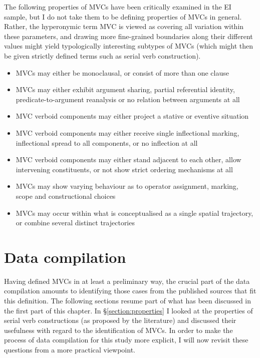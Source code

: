 The following properties of MVCs have been critically examined in the EI sample, but I do not take them to be defining properties of MVCs in general. Rather, the hyperonymic term MVC is viewed as covering all variation within these parameters, and drawing more fine-grained boundaries along their different values might yield typologically interesting subtypes of MVCs (which might then be given strictly defined terms such as serial verb construction).

\begin{itemize}
\item MVCs may either be monoclausal, or consist of more than one clause
\item MVCs may either exhibit argument sharing, partial referential identity, predicate-to-argument reanalysis or no relation between arguments at all
\item MVC verboid components may either project a stative or eventive situation
\item MVC verboid components may either receive single inflectional marking, inflectional spread to all components, or no inflection at all
\item MVC verboid components may either stand adjacent to each other, allow intervening constituents, or not show strict ordering mechanisms at all
\item MVCs may show varying behaviour as to operator assignment, marking, scope and constructional choices
\item MVCs may occur within what is conceptualised as a single spatial trajectory, or combine several distinct trajectories 
\end{itemize}

\section{Data compilation}

Having defined MVCs in at least a preliminary way, the crucial part of the data compilation amounts to identifying those cases from the published sources that fit this definition. The following sections resume part of what has been discussed in the first part of this chapter. In §\ref{section:properties} I looked at the properties of serial verb constructions (as proposed by the literature) and discussed their usefulness with regard to the identification of MVCs. In order to make the process of data compilation for this study more explicit, I will now revisit these questions from a more practical viewpoint.

